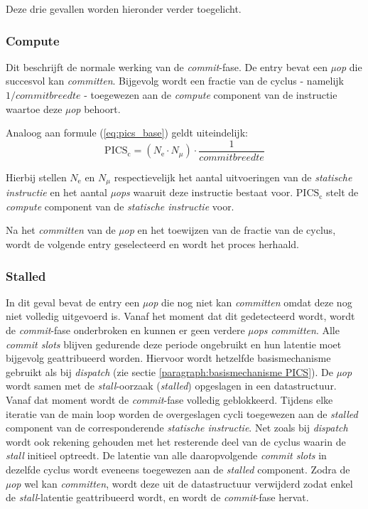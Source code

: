 \documentclass[12pt,a4paper,faculty=ea,language=nl]{ugent-doc}
\begin{document}
Deze drie gevallen worden hieronder verder toegelicht.

\subsubsection{Compute}

Dit beschrijft de normale werking van de \textit{commit}-fase. De entry bevat een \textit{µop} die succesvol kan \textit{committen}. Bijgevolg wordt een fractie van de cyclus - namelijk \(1 / \textit{commitbreedte}\) - toegewezen aan de \textit{compute} component van de instructie waartoe deze \textit{µop} behoort.

Analoog aan formule (\ref{eq:pics_base}) geldt uiteindelijk:
\begin{equation}
    \text{PICS}_{\text{c}} = (N_{\text{e}} \cdot N_{\mu}) \cdot \frac{1}{\textit{commitbreedte}}
    \label{eq:pics_compute}
\end{equation}

Hierbij stellen $N_{\text{e}}$ en $N_{\mu}$ respectievelijk het aantal uitvoeringen van de \textit{statische instructie} en het aantal \textit{µops} waaruit deze instructie bestaat voor.
$\text{PICS}_{\text{c}}$ stelt de \textit{compute} component van de \textit{statische instructie} voor.

Na het \textit{committen} van de \textit{µop} en het toewijzen van de fractie van de cyclus, wordt de volgende entry geselecteerd en wordt het proces herhaald.

\subsubsection{Stalled}

In dit geval bevat de entry een \textit{µop} die nog niet kan \textit{committen} omdat deze nog niet volledig uitgevoerd is.
Vanaf het moment dat dit gedetecteerd wordt, wordt de \textit{commit}-fase onderbroken en kunnen er geen verdere \textit{µops} \textit{committen}.
Alle \textit{commit slots} blijven gedurende deze periode ongebruikt en hun latentie moet bijgevolg geattribueerd worden.
Hiervoor wordt hetzelfde basismechanisme gebruikt als bij \textit{dispatch} (zie sectie \ref{paragraph:basismechanisme PICS}).
De \textit{µop} wordt samen met de \textit{stall}-oorzaak (\textit{stalled}) opgeslagen in een datastructuur. Vanaf dat moment wordt de \textit{commit}-fase volledig geblokkeerd.
Tijdens elke iteratie van de main loop worden de overgeslagen cycli toegewezen aan de \textit{stalled} component van de corresponderende \textit{statische instructie}.
Net zoals bij \textit{dispatch} wordt ook rekening gehouden met het resterende deel van de cyclus waarin de \textit{stall} initieel optreedt. De latentie van alle daaropvolgende \textit{commit slots} in dezelfde cyclus wordt eveneens toegewezen aan de \textit{stalled} component.
Zodra de \textit{µop} wel kan \textit{committen}, wordt deze uit de datastructuur verwijderd zodat enkel de \textit{stall}-latentie geattribueerd wordt, en wordt de \textit{commit}-fase hervat.
\end{document}
